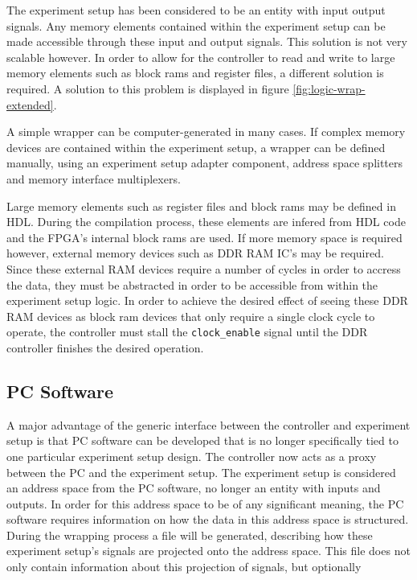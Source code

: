 \documentclass[openright]{uva-bachelor-thesis}
\begin{document}
The experiment setup has been considered to be an entity with input output signals. Any memory elements contained within the experiment setup can be made accessible through these input and output signals. This solution is not very scalable however. In order to allow for the controller to read and write to large memory elements such as block rams and register files, a different solution is required. A solution to this problem is displayed in figure \ref{fig:logic-wrap-extended}. 

A simple wrapper can be computer-generated in many cases. If complex memory devices are contained within the experiment setup, a wrapper can be defined manually, using an experiment setup adapter component, address space splitters and memory interface multiplexers. 

Large memory elements such as register files and block rams may be defined in HDL. During the compilation process, these elements are infered from HDL code and the FPGA's internal block rams are used. If more memory space is required however, external memory devices such as DDR RAM IC's may be required. Since these external RAM devices require a number of cycles in order to accress the data, they must be abstracted in order to be accessible from within the experiment setup logic. In order to achieve the desired effect of seeing these DDR RAM devices as block ram devices that only require a single clock cycle to operate, the controller must stall the \texttt{clock\_enable} signal until the DDR controller finishes the desired operation. 

\subsection{PC Software}
A major advantage of the generic interface between the controller and experiment setup is that PC software can be developed that is no longer specifically tied to one particular experiment setup design. The controller now acts as a proxy between the PC and the experiment setup. The experiment setup is considered an address space from the PC software, no longer an entity with inputs and outputs. In order for this address space to be of any significant meaning, the PC software requires information on how the data in this address space is structured. During the wrapping process a file will be generated, describing how these experiment setup's signals are projected onto the address space. This file does not only contain information about this projection of signals, but optionally 
\end{document}
